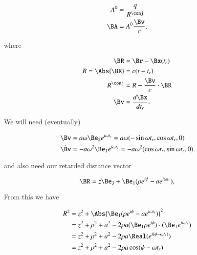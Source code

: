 {\begin{equation}\label{eqn:relativisticElectrodynamicsExamReflection:50}
\begin{aligned}
A^0 &= \frac{q}{R^\conj} \\
\BA &= A^0 \frac{\Bv}{c},
\end{aligned}
\end{equation}

where

\begin{equation}\label{eqn:relativisticElectrodynamicsExamReflection:70}
\begin{aligned}
\BR &= \Br - \Bx(t_r) \\
R = \Abs{\BR} &= c (t - t_r) \\
R^\conj &= R - \frac{\Bv}{c} \cdot \BR \\
\Bv &= \frac{d\Bx}{dt_r}.
\end{aligned}
\end{equation}

We will need (eventually)

\begin{equation}\label{eqn:relativisticElectrodynamicsExamReflection:90}
\begin{aligned}
\Bv &= a \omega \Be_2 e^{i \omega t_r} = a \omega ( -\sin \omega t_r, \cos\omega t_r, 0) \\
\dot{\Bv} &= -a \omega^2 \Be_1 e^{i \omega t_r} =
-a \omega^2 (\cos\omega t_r, \sin\omega t_r, 0)
\end{aligned}
\end{equation}

and also need our retarded distance vector

\begin{equation}\label{eqn:relativisticElectrodynamicsExamReflection:110}
\BR = z \Be_3 + \Be_1 (\rho e^{i \phi} - a e^{i \omega t_r} ),
\end{equation}

From this we have

\begin{equation}\label{eqn:relativisticElectrodynamicsExamReflection:1050}
\begin{aligned}
R^2
&= z^2 + \Abs{\Be_1 (\rho e^{i \phi} - a e^{i \omega t_r} )}^2 \\
&= z^2 + \rho^2 + a^2 - 2 \rho a (\Be_1 \rho e^{i \phi}) \cdot (\Be_1 e^{i \omega t_r}) \\
&= z^2 + \rho^2 + a^2 - 2 \rho a \Real( e^{ i(\phi - \omega t_r) } ) \\
&= z^2 + \rho^2 + a^2 - 2 \rho a \cos(\phi - \omega t_r)
\end{aligned}
\end{equation}

}
